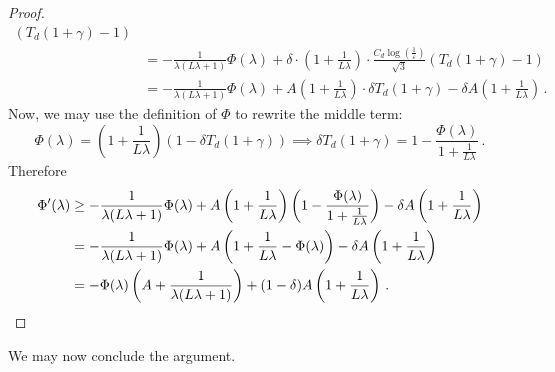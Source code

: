 \documentclass[10pt,a4paper]{article}
\renewcommand{\epsilon}{\varepsilon}
\begin{document}
\begin{proof}
\begin{align*}
                \left(T_d(1+\gamma) - 1\right) \\
        &= -\frac{1}{\lambda (L\lambda+1)} \Phi(\lambda)
            + \delta \cdot
            \left(1 + \frac{1}{L \lambda}\right) \cdot
                \frac{C_d \log \left(\frac{1}{\epsilon} \right)}{\sqrt{3}}
                \left(T_d(1+\gamma) - 1\right) \\
        &= -\frac{1}{\lambda (L\lambda+1)} \Phi(\lambda)
            + A \left(1 + \frac{1}{L \lambda}\right) \cdot \delta T_d(1+\gamma)
            - \delta A \left(1 + \frac{1}{L \lambda}\right) \,.
    \end{align*}
    Now, we may use the definition of $\Phi$ to rewrite the middle term:
    \[
        \Phi(\lambda) =
        \left(1 + \frac{1}{L \lambda}\right) \left(1 - \delta T_d(1 + \gamma)\right)
        \implies
        \delta T_d(1 + \gamma)
        = 1 - \frac{\Phi(\lambda)}{1 + \frac{1}{L \lambda}} \,.
    \]
    Therefore
    \begin{align*}
        \Phi'(\lambda)
        &\ge -\frac{1}{\lambda (L\lambda+1)} \Phi(\lambda)
            + A \left(1 + \frac{1}{L \lambda}\right)
                \left( 1 - \frac{\Phi(\lambda)}{1 + \frac{1}{L \lambda}} \right)
            - \delta A \left(1 + \frac{1}{L \lambda}\right) \\
        &= -\frac{1}{\lambda (L\lambda+1)} \Phi(\lambda)
            + A \left( 1 + \frac{1}{L\lambda} - \Phi(\lambda) \right)
            - \delta A \left(1 + \frac{1}{L \lambda}\right) \\
        &= -\Phi(\lambda) \left( A + \frac{1}{\lambda (L\lambda+1)} \right)
            + (1-\delta) A \left( 1 + \frac{1}{L\lambda} \right) \,. \qedhere
    \end{align*}
\end{proof}

We may now conclude the argument.
\end{document}
